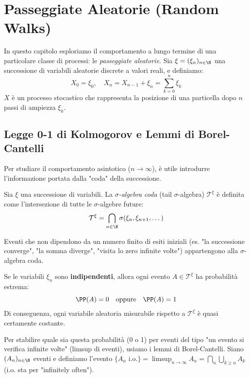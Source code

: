
\chapter{Passeggiate Aleatorie (Random Walks)}

In questo capitolo esploriamo il comportamento a lungo termine di una particolare classe di processi: le \emph{passeggiate aleatorie}. 
Sia $\xi = (\xi_n)_{n \in \N}$ una successione di variabili aleatorie discrete a valori reali, e definiamo:
\[ X_0 = \xi_0, \quad X_n = X_{n-1} + \xi_n = \sum_{k=0}^n \xi_k \]
$X$ è un processo stocastico che rappresenta la posizione di una particella dopo $n$ passi di ampiezza $\xi_k$.

\section{Legge 0-1 di Kolmogorov e Lemmi di Borel-Cantelli}

Per studiare il comportamento asintotico ($n \to \infty$), è utile introdurre l'informazione portata dalla "coda" della successione.

\begin{definition}
Sia $\xi$ una successione di variabili. La \emph{$\sigma$-algebra coda} (tail $\sigma$-algebra) $\mathcal{T}^\xi$ è definita come l'intersezione di tutte le $\sigma$-algebre future:
\[ \mathcal{T}^\xi = \bigcap_{n \in \N} \sigma(\xi_n, \xi_{n+1}, \dots) \]
\end{definition}

Eventi che non dipendono da un numero finito di esiti iniziali (es. "la successione converge", "la somma diverge", "visita lo zero infinite volte") appartengono alla $\sigma$-algebra coda.

\begin{theorem}
Se le variabili $\xi_n$ sono \textbf{indipendenti}, allora ogni evento $A \in \mathcal{T}^\xi$ ha probabilità estrema:
\[ \PP(A) = 0 \quad \text{oppure} \quad \PP(A) = 1 \]
Di conseguenza, ogni variabile aleatoria misurabile rispetto a $\mathcal{T}^\xi$ è quasi certamente costante.
\end{theorem}

Per stabilire quale sia questa probabilità (0 o 1) per eventi del tipo "un evento si verifica infinite volte" (limsup di eventi), usiamo i lemmi di Borel-Cantelli.
Siano $(A_n)_{n \in \N}$ eventi e definiamo l'evento $\{A_n \text{ i.o.}\} = \limsup_{n \to \infty} A_n = \bigcap_{n} \bigcup_{k \ge n} A_k$ (i.o. sta per "infinitely often").

